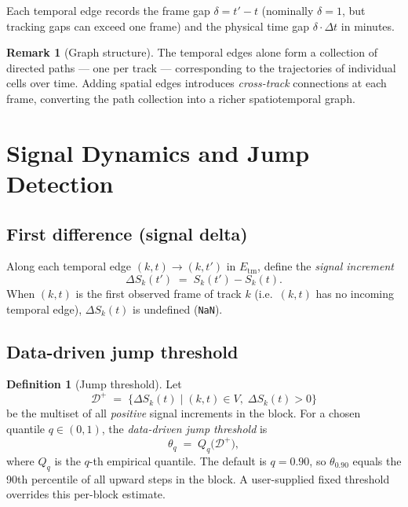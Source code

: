 \documentclass[11pt,a4paper]{article}
\theoremstyle{definition}
\newtheorem{definition}{Definition}[section]
\newtheorem{remark}{Remark}[section]
\theoremstyle{plain}
\newcommand{\sig}[2]{S_{#1}(#2)}
\newcommand{\dS}[2]{\Delta S_{#1}(#2)}
\newcommand{\1}[1]{\mathbf{1}\!\left[#1\right]}
\begin{document}
Each temporal edge records the frame gap $\delta = t' - t$ (nominally
$\delta = 1$, but tracking gaps can exceed one frame) and the physical
time gap $\delta \cdot \Delta t$ in minutes.

\begin{remark}[Graph structure]
The temporal edges alone form a collection of directed paths --- one per
track --- corresponding to the trajectories of individual cells over time.
Adding spatial edges introduces \emph{cross-track} connections at each
frame, converting the path collection into a richer spatiotemporal graph.
\end{remark}

\section{Signal Dynamics and Jump Detection}

\subsection{First difference (signal delta)}

Along each temporal edge $(k,t) \to (k,t')$ in $E_{\mathrm{tm}}$, define the
\emph{signal increment}
\[
  \dS{k}{t'} \;=\; \sig{k}{t'} - \sig{k}{t}.
\]
When $(k,t)$ is the first observed frame of track $k$ (i.e.\ $(k,t)$ has no
incoming temporal edge), $\dS{k}{t}$ is undefined (\texttt{NaN}).

\subsection{Data-driven jump threshold}

\begin{definition}[Jump threshold]\label{def:threshold}
Let
\[
  \mathcal{D}^+ \;=\;
  \bigl\{\dS{k}{t} \;\big|\; (k,t) \in V,\; \dS{k}{t} > 0\bigr\}
\]
be the multiset of all \emph{positive} signal increments in the block.
For a chosen quantile $q \in (0,1)$, the \emph{data-driven jump threshold}
is
\[
  \theta_q \;=\; Q_q\!\bigl(\mathcal{D}^+\bigr),
\]
where $Q_q$ is the $q$-th empirical quantile.
The default is $q = 0.90$, so $\theta_{0.90}$ equals the 90th percentile of
all upward steps in the block.
A user-supplied fixed threshold overrides this per-block estimate.
\end{definition}
\end{document}
